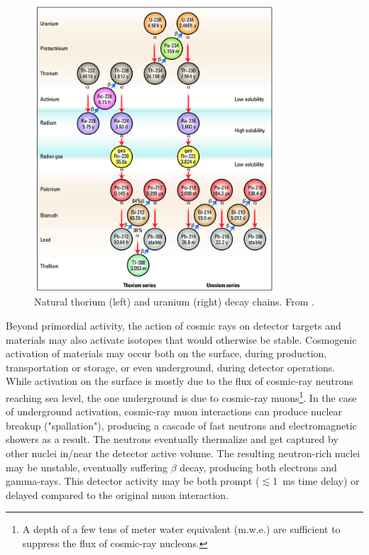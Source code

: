 \begin{figure}[t!b!]
\begin{center}
\includegraphics[width=0.8\textwidth]{img/Natural-thorium-and-uranium-decay-chains.png} 
\caption{Natural thorium (left) and uranium (right) decay chains. From \cite{decaychain}.} \label{fig:decaychain}
\end{center}
\end{figure}

Beyond primordial activity, the action of cosmic rays on detector targets and materials may also activate isotopes that would otherwise be stable. Cosmogenic activation of materials may occur both on the surface, during production, transportation or storage, or even underground, during detector operations. While activation on the surface is mostly due to the flux of cosmic-ray neutrons reaching sea level, the one underground is due to cosmic-ray muons\footnote{A depth of a few tens of meter water equivalent (m.w.e.) are sufficient to suppress the flux of cosmic-ray nucleons.}. In the case of underground activation, cosmic-ray muon interactions can produce nuclear breakup ("spallation"), producing a cascade of fast neutrons and electromagnetic showers as a result. The neutrons eventually thermalize and get captured by other nuclei in/near the detector active volume. The resulting neutron-rich nuclei may be unstable, eventually suffering $\beta$ decay, producing both electrons and gamma-rays. This detector activity may be both prompt ($\lesssim$1~ms time delay) or delayed compared to the original muon interaction.


